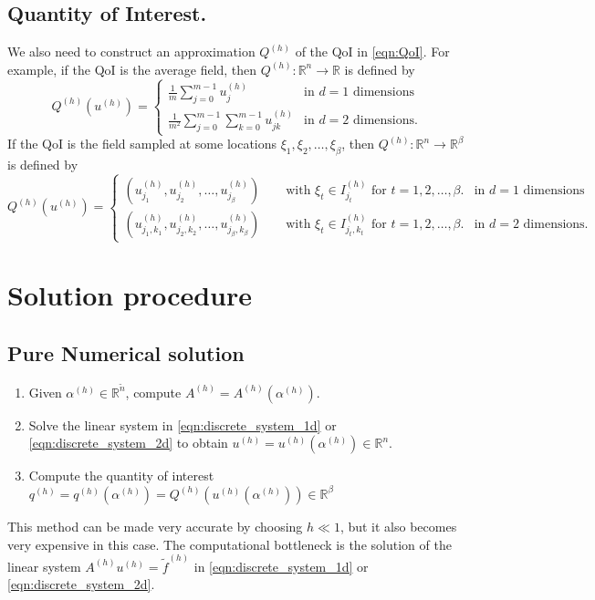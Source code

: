 \documentclass[11pt]{article}
\begin{document}
\subsection{Quantity of Interest.}
We also need to construct an approximation $Q^{(h)}$ of the QoI in \eqref{eqn:QoI}. For example, if the QoI is the average field, then $Q^{(h)}:\mathbb{R}^n\rightarrow \mathbb{R}$ is defined by
\begin{equation}
    Q^{(h)}(u^{(h)}) = \begin{cases}
        \frac{1}{m}\sum_{j=0}^{m-1}u^{(h)}_j & \text{in $d=1$ dimensions}\\[1ex]
        \frac{1}{m^2}\sum_{j=0}^{m-1}\sum_{k=0}^{m-1}u^{(h)}_{jk} & \text{in $d=2$ dimensions.}
    \end{cases}
\end{equation}
If the QoI is the field sampled at some locations $\xi_1,\xi_2,\dots,\xi_\beta$, then $Q^{(h)}:\mathbb{R}^n\rightarrow \mathbb{R}^\beta$ is defined by
\begin{equation}
    Q^{(h)}(u^{(h)}) = \begin{cases}
        \left(u^{(h)}_{j_1},u^{(h)}_{j_2},\dots,u^{(h)}_{j_\beta}\right) \qquad\text{with $\xi_t\in I_{j_t}^{(h)}$ for $t =1,2,\dots,\beta$.} & \text{in $d=1$ dimensions}\\[1ex]
        \left(u^{(h)}_{j_1,k_1},u^{(h)}_{j_2,k_2},\dots,u^{(h)}_{j_\beta,k_\beta}\right) \qquad\text{with $\xi_t\in I_{j_t,k_t}^{(h)}$ for $t =1,2,\dots,\beta$.} & \text{in $d=2$ dimensions.}
    \end{cases}
\end{equation}
\section{Solution procedure}
\subsection{Pure Numerical solution}
\begin{enumerate}
\item Given $\alpha^{(h)}\in\mathbb{R}^{\widetilde{n}}$, compute $A^{(h)}=A^{(h)}(\alpha^{(h)})$.
\item Solve the linear system in \eqref{eqn:discrete_system_1d} or \eqref{eqn:discrete_system_2d} to obtain $u^{(h)}=u^{(h)}(\alpha^{(h)})\in\mathbb{R}^n$.
\item Compute the quantity of interest $q^{(h)} = q^{(h)}(\alpha^{(h)})= Q^{(h)}(u^{(h)}(\alpha^{(h)}))\in\mathbb{R}^\beta$
\end{enumerate}
This method can be made very accurate by choosing $h\ll1$, but it also becomes very expensive in this case. The computational bottleneck is the solution of the linear system $A^{(h)} u^{(h)} = \widetilde{f}^{(h)}$ in \eqref{eqn:discrete_system_1d} or \eqref{eqn:discrete_system_2d}.
\end{document}
